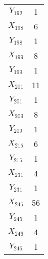 \documentclass[a4paper,10pt]{article}
\begin{document}
\begin{center}
\begin{longtable}{cc}
$Y_{192}$ & 1 \\
$X_{198}$ & 6 \\
$Y_{198}$ & 1 \\
$X_{199}$ & 8 \\
$Y_{199}$ & 1 \\
$X_{201}$ & 11 \\
$Y_{201}$ & 1 \\
$X_{209}$ & 8 \\
$Y_{209}$ & 1 \\
$X_{215}$ & 6 \\
$Y_{215}$ & 1 \\
$X_{231}$ & 4 \\
$Y_{231}$ & 1 \\
$X_{245}$ & 56 \\
$Y_{245}$ & 1 \\
$X_{246}$ & 4 \\
$Y_{246}$ & 1 \\
\end{longtable}
\end{center}
\end{document}
